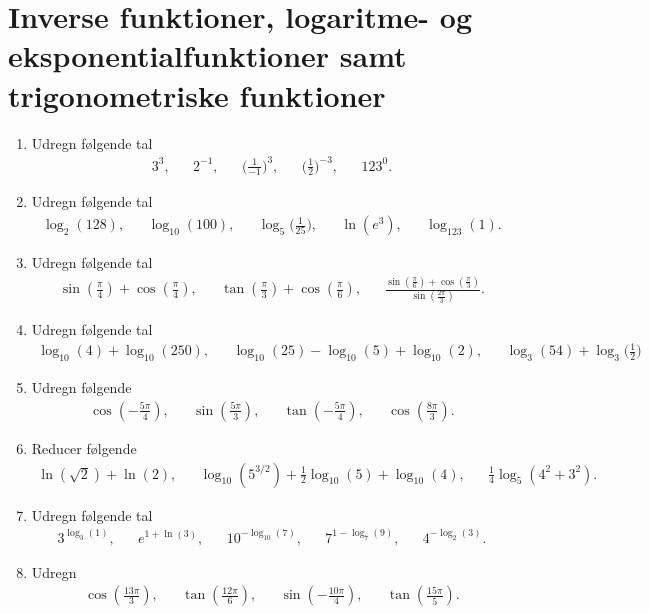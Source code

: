 \section{Inverse funktioner, logaritme- og eksponentialfunktioner samt trigonometriske funktioner}
\begin{enumerate}
	\item Udregn følgende tal
	\begin{align*}
	3^3,&& 2^{-1}, &&\Big(\frac{1}{-1}\Big)^{3},&&\Big(\frac{1}{2}\Big)^{-3},&& 123^0.
	\end{align*}
	\item Udregn følgende tal
	\begin{align*}
	\log_2(128),&& \log_{10}(100),&& \log_5\Big(\frac{1}{25}\Big),&& \ln(e^3),&&\log_{123}(1).
	\end{align*}
	
	\item Udregn følgende tal
	\begin{align*}
	\sin(\frac{\pi}{4})+\cos(\frac{\pi}{4}),&& \tan(\frac{\pi}{3})+\cos(\frac{\pi}{6}),&& \frac{\sin(\frac{\pi}{6})+\cos(\frac{\pi}{3})}{\sin(\frac{2\pi}{3})}.
	\end{align*}
	

	\item Udregn følgende tal
	\begin{align*}
	\log_{10}(4)+\log_{10}(250),&&\log_{10}(25)-\log_{10}(5)+\log_{10}(2),&& \log_3(54)+\log_3\Big(\frac{1}{2}\Big)
	\end{align*}
	
	\item Udregn følgende
	\begin{align*}
	\cos(-\frac{5\pi}{4}),&& \sin(\frac{5\pi}{3}),&&\tan(-\frac{5\pi}{4}),&& \cos(\frac{8\pi}{3}).
	\end{align*}
	
	
	\item Reducer følgende
	\begin{align*}
	\ln(\sqrt{2})+\ln(2),&& \log_{10}(5^{3/2})+\frac{1}{2}\log_{10}(5)+\log_{10}(4),&& \frac{1}{4}\log_5(4^2+3^2).
	\end{align*}
	
	
	\item Udregn følgende tal
	\begin{align*}
	3^{\log_3(1)},&&e^{1+\ln(3)},&& 10^{-\log_{10}(7)},&& 7^{1-\log_7(9)},&& 4^{-\log_2(3)}.
	\end{align*}
	
	\item Udregn
	\begin{align*}
	\cos(\frac{13\pi}{3}),&& \tan(\frac{12\pi}{6}),&& \sin(-\frac{10\pi}{4}),&& \tan(\frac{15 \pi}{5}).
	\end{align*}
	

\end{enumerate}
